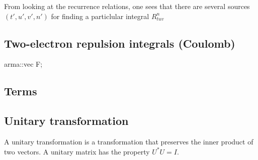 \documentclass[a4paper,10pt, twocolumn, pre]{revtex4}
\begin{document}
From looking at the recurrence relations, one sees that there are several sources $(t', u', v', n')$ for finding a particlular integral $R_{tuv}^{n}$

\subsection{Two-electron repulsion integrals (Coulomb)}arma::vec F;


\begin{appendices}
\section{Terms}
\subsection{Unitary transformation}
A unitary transformation is a transformation that preserves the inner product of two vectors. A unitary matrix has the property $U^*U = I$. 

\end{appendices}



\end{document}

